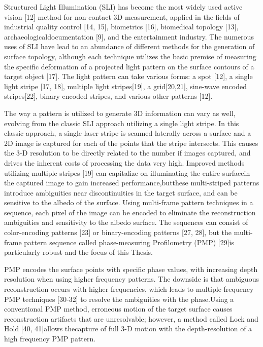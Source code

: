 Structured Light Illumination (SLI) has become the most widely used active vision [12] method for non-contact 3D measurement, applied in the fields of industrial quality control [14, 15], biometrics [16], biomedical topology [13],  archaeologicaldocumentation [9],  and the entertainment industry.  The numerous uses of SLI have lead to an abundance of different methods for the generation of surface topology, although each technique utilizes the basic premise of measuring the specific deformation of a projected light pattern on the surface contours of a target object [17].  The light pattern can take various forms: a spot [12], a single light stripe [17, 18], multiple light stripes[19], a grid[20,21], sine-wave encoded stripes[22], binary encoded stripes, and various other patterns [12].

The way a pattern is utilized to generate 3D information can vary as well, evolving from the classic SLI approach utilizing a single light stripe.  In this classic approach, a single laser stripe is scanned laterally across a surface and a 2D image is captured for each of the points that the stripe intersects.  This causes the 3-D resolution to be directly related to the number if images captured, and drives the inherent costs of processing the data very high.  Improved methods utilizing multiple stripes [19] can capitalize on illuminating the entire surfacein the captured image to gain increased performance,butthese multi-striped patterns introduce ambiguities near discontinuities in the target surface, and can be sensitive to the albedo of the surface.  Using multi-frame pattern techniques in a sequence, each pixel of the image can be encoded to eliminate the reconstruction ambiguities and sensitivity to the albedo surface.  The sequences can consist of color-encoding patterns [23] or binary-encoding patterns [27, 28], but the multi-frame pattern sequence called phase-measuring Profilometry (PMP) [29]is particularly robust and the focus of this Thesis.

PMP encodes the surface points with specific phase values, with increasing depth resolution when using higher frequency patterns.  The downside is that ambiguous reconstruction occurs with higher frequencies, which leads to multiple-frequency PMP techniques [30-32] to resolve the ambiguities with the phase.Using a conventional PMP method, erroneous motion of the target surface causes reconstruction artifacts that are unresolvable; however, a method called Lock and Hold [40, 41]allows thecapture of full 3-D motion with the depth-resolution of a high frequency PMP pattern.   








